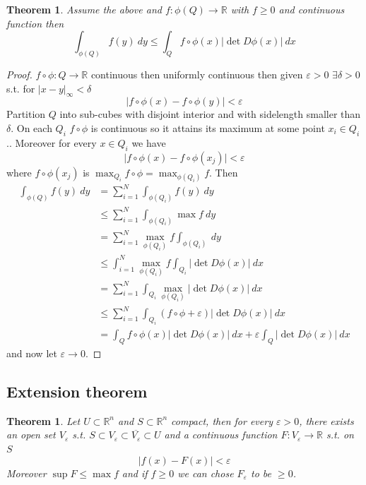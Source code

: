 \documentclass[11pt,a4paper]{article}
\theoremstyle{definition}
\theoremstyle{plain}
\newtheorem{theorem}[definition]{Theorem}
\theoremstyle{remark}
\newcommand{\R}{\mathbb{R}}
\newcommand{\abs}[1]{\lvert #1 \rvert}
\begin{document}
\begin{theorem}
    Assume the above and $f \colon \phi(Q) \to \R$ with $f \ge 0$ and continuous function then 
    $$\int_{\phi(Q)} f(y) \ dy \le \int_Q f \circ \phi(x) \abs{\det D\phi (x)} \ dx$$
\end{theorem}

\begin{proof}
    $f \circ \phi \colon Q \to \R$ continuous then uniformly continuous then 
    given $\varepsilon > 0$ $\exists \delta > 0$ s.t. for $\abs{x-y}_\infty < \delta$
    $$\abs{f \circ \phi(x) - f \circ \phi(y)} < \varepsilon$$
    Partition $Q$ into sub-cubes with disjoint interior and with sidelength smaller than 
    $\delta$. On each $Q_i$ $f \circ \phi$ is continuous so it attains its maximum at some point $x_i \in Q_i$.. 
    Moreover for every $x \in Q_i$ we have 
    $$\abs{f \circ \phi(x) - f \circ \phi(x_j)} < \varepsilon$$
    where $f \circ \phi(x_j)$ is $\max_{Q_i} f \circ \phi = \max_{\phi(Q_i)} f$. 
    Then 
    \begin{align*}
        \int_{\phi(Q)} f(y) \ dy &= \sum_{i=1}^N \int_{\phi(Q_i)} f(y) \ dy \\
        &\le \sum_{i=1}^N \int_{\phi(Q_i)} \max f \ dy \\
        &= \sum_{i=1}^N \max_{\phi(Q_i)} f \int_{\phi(Q_i) }\ dy  \\
        &\le \int_{i=1}^N \max_{\phi(Q_i)} f \int_{Q_i} \abs{\det D \phi(x)} \ dx \\
        &= \sum_{i=1}^N \int_{Q_i} \max_{\phi(Q_i)} \abs{\det D\phi(x)} \ dx \\
        &\le \sum_{i=1}^N \int_{Q_i} (f \circ \phi + \varepsilon) \abs{\det D\phi(x)} \ dx \\
        &= \int_Q f \circ \phi(x) \abs{\det D\phi(x)} \ dx + \varepsilon \int_Q \abs{\det D\phi (x)} \ dx
    \end{align*}
    and now let $\varepsilon \to 0$. 
\end{proof}

\subsection{Extension theorem} 

\begin{theorem}
    Let $U \subset \R^n$ and $S \subset \R^n$ compact, then for every $\varepsilon > 0$, there exists an 
    open set $V_\varepsilon$ s.t. $S \subset V_\varepsilon \subset \overline{V_\varepsilon} \subset U$ and a  
    continuous function $F \colon V_\varepsilon \to \R$ s.t. on $S$ 
    $$\abs{f(x) - F(x)} < \varepsilon$$
    Moreover $\sup F \le \max f$ and if $f \ge 0$ we can chose $F_\varepsilon$ to be $\ge 0$. 
\end{theorem}
\end{document}
